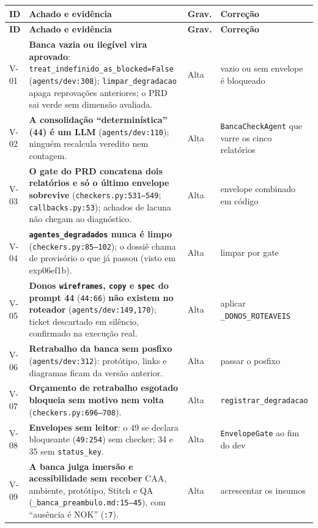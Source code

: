 \documentclass[11pt,a4paper]{article}
\begin{document}
\small
\begin{longtable}{@{}p{0.9cm} >{\raggedright\arraybackslash}p{8.6cm} p{1.1cm} >{\raggedright\arraybackslash}p{4.9cm}@{}}
\toprule
\textbf{ID} & \textbf{Achado e evidência} & \textbf{Grav.} & \textbf{Correção} \\
\midrule
\endfirsthead
\toprule
\textbf{ID} & \textbf{Achado e evidência} & \textbf{Grav.} & \textbf{Correção} \\
\midrule
\endhead
\bottomrule
\endfoot
V-01 & \textbf{Banca vazia ou ilegível vira aprovado}: \texttt{treat\_indefinido\_as\_blocked=False} (\texttt{agents/dev:308}); \texttt{limpar\_degradacao} apaga reprovações anteriores; o PRD sai verde sem dimensão avaliada. & Alta & vazio ou sem envelope é bloqueado \\
V-02 & \textbf{A consolidação ``determinística'' (44) é um LLM} (\texttt{agents/dev:110}); ninguém recalcula veredito nem contagem. & Alta & \texttt{BancaCheckAgent} que varre os cinco relatórios \\
V-03 & \textbf{O gate do PRD concatena dois relatórios e só o último envelope sobrevive} (\texttt{checkers.py:531--549}; \texttt{callbacks.py:53}); achados de lacuna não chegam ao diagnóstico. & Alta & envelope combinado em código \\
V-04 & \textbf{\texttt{agentes\_degradados} nunca é limpo} (\texttt{checkers.py:85--102}); o dossiê chama de provisório o que já passou (visto em exp06ef1b). & Alta & limpar por gate \\
V-05 & \textbf{Donos \texttt{wireframes}, \texttt{copy} e \texttt{spec} do prompt 44} (\texttt{44:66}) \textbf{não existem no roteador} (\texttt{agents/dev:149,170}); ticket descartado em silêncio, confirmado na execução real. & Alta & aplicar \texttt{\_DONOS\_ROTEAVEIS} \\
V-06 & \textbf{Retrabalho da banca sem posfixo} (\texttt{agents/dev:312}): protótipo, links e diagramas ficam da versão anterior. & Alta & passar o posfixo \\
V-07 & \textbf{Orçamento de retrabalho esgotado bloqueia sem motivo nem volta} (\texttt{checkers.py:696--708}). & Alta & \texttt{registrar\_degradacao} \\
V-08 & \textbf{Envelopes sem leitor}: o 49 se declara bloqueante (\texttt{49:254}) sem checker; 34 e 35 sem \texttt{status\_key}. & Alta & \texttt{EnvelopeGate} ao fim do dev \\
V-09 & \textbf{A banca julga imersão e acessibilidade sem receber} CAA, ambiente, protótipo, Stitch e QA (\texttt{\_banca\_preambulo.md:15--45}), com ``ausência é NOK'' (\texttt{:7}). & Alta & acrescentar os insumos \\

\end{longtable}
\end{document}
